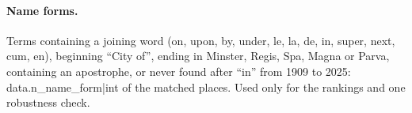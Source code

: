 \documentclass[11pt,a4paper]{article}
\begin{document}
\paragraph{Name forms.} Terms containing a joining word (on, upon, by, under, le, la, de, in, super, next, cum, en), beginning ``City of'', ending in Minster, Regis, Spa, Magna or Parva, containing an apostrophe, or never found after ``in'' from 1909 to 2025: {{data.n_name_form|int}} of the matched places. Used only for the rankings and one robustness check.
\end{document}
